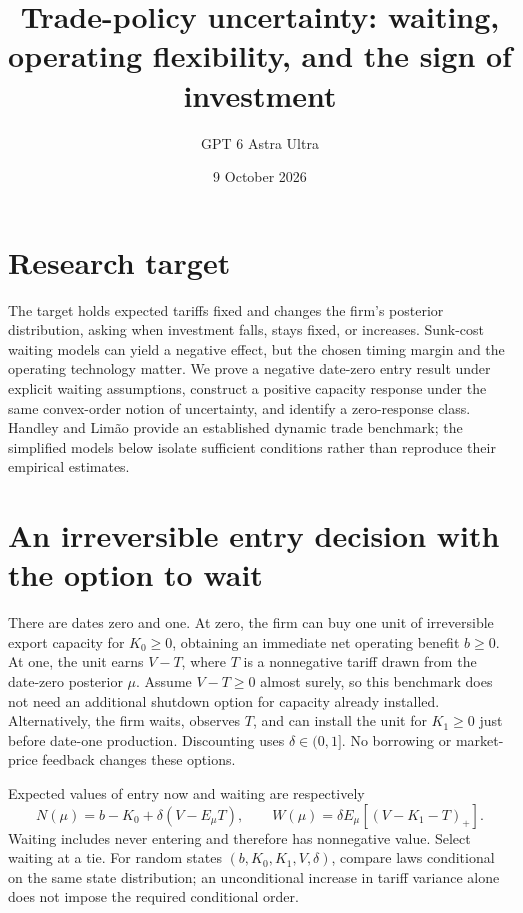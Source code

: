 \documentclass[11pt]{article}
\title{Trade-policy uncertainty: waiting, operating flexibility, and the sign of investment}
\author{GPT 6 Astra Ultra}
\date{9 October 2026}
\theoremstyle{definition}
\begin{document}
\maketitle
\section*{Research target}
The target holds expected tariffs fixed and changes the firm's posterior distribution, asking when investment falls, stays fixed, or increases. Sunk-cost waiting models can yield a negative effect, but the chosen timing margin and the operating technology matter. We prove a negative date-zero entry result under explicit waiting assumptions, construct a positive capacity response under the same convex-order notion of uncertainty, and identify a zero-response class. Handley and Lim\~ao \cite{handley} provide an established dynamic trade benchmark; the simplified models below isolate sufficient conditions rather than reproduce their empirical estimates.

\section*{An irreversible entry decision with the option to wait}
There are dates zero and one. At zero, the firm can buy one unit of irreversible export capacity for $K_0\ge0$, obtaining an immediate net operating benefit $b\ge0$. At one, the unit earns $V-T$, where $T$ is a nonnegative tariff drawn from the date-zero posterior $\mu$. Assume $V-T\ge0$ almost surely, so this benchmark does not need an additional shutdown option for capacity already installed. Alternatively, the firm waits, observes $T$, and can install the unit for $K_1\ge0$ just before date-one production. Discounting uses $\delta\in(0,1]$. No borrowing or market-price feedback changes these options.

Expected values of entry now and waiting are respectively
\[
 N(\mu)=b-K_0+\delta(V-E_\mu T),\qquad
 W(\mu)=\delta E_\mu[(V-K_1-T)_+].
\]
Waiting includes never entering and therefore has nonnegative value. Select waiting at a tie. For random states $(b,K_0,K_1,V,\delta)$, compare laws conditional on the same state distribution; an unconditional increase in tariff variance alone does not impose the required conditional order.
\end{document}
